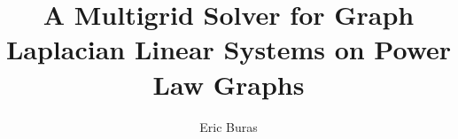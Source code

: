 \documentclass[12pt]{ruthesis}
\title{A Multigrid Solver for Graph Laplacian Linear Systems on Power Law Graphs}
\author{Eric Buras}
\begin{document}
\begin{frontmatter}
   \maketitle








\end{frontmatter}
\begin{spacing}{1}


\end{spacing}
\end{document}
